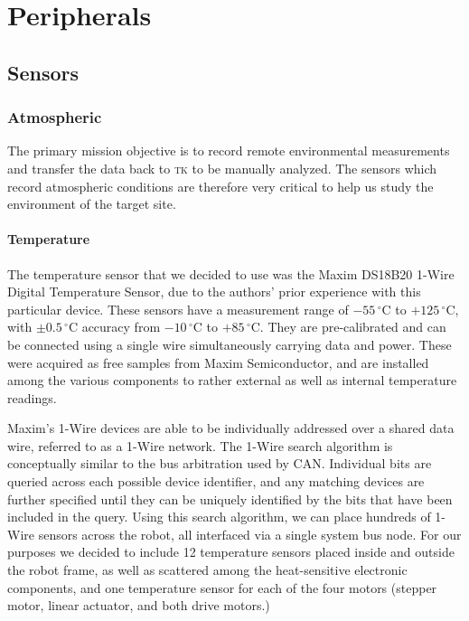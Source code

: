\documentclass[12pt]{article}
\newcommand{\brand}{}
\newcommand{\degrees}{\,^{\circ}\mathrm{C}}
\begin{document}
\section{Peripherals}
\subsection{Sensors}
\subsubsection{Atmospheric}
The primary mission objective is to record remote environmental measurements and transfer the data back to \textsc{tk} to be manually analyzed. The sensors which record atmospheric conditions are therefore very critical to help us study the environment of the target site.
    \paragraph*{Temperature}
    The temperature sensor that we decided to use was the \brand{Maxim DS18B20} 1-Wire Digital Temperature Sensor, due to the authors' prior experience with this particular device. These sensors have a measurement range of $-55\degrees{}$ to $+125\degrees{}$, with $\pm0.5\degrees{}$ accuracy from $-10\degrees{}$ to $+85\degrees{}$. They are pre-calibrated and can be connected using a single wire simultaneously carrying data and power. These were acquired as free samples from Maxim Semiconductor, and are installed among the various components to rather external as well as internal temperature readings.

    Maxim's 1-Wire devices are able to be individually addressed over a shared data wire, referred to as a 1-Wire network. The 1-Wire search algorithm is conceptually similar to the bus arbitration used by CAN. Individual bits are queried across each possible device identifier, and any matching devices are further specified until they can be uniquely identified by the bits that have been included in the query\cite{1wiresearch}. Using this search algorithm, we can place hundreds of 1-Wire sensors across the robot, all interfaced via a single system bus node. For our purposes we decided to include 12 temperature sensors placed inside and outside the robot frame, as well as scattered among the heat-sensitive electronic components, and one temperature sensor for each of the four motors (stepper motor, linear actuator, and both drive motors.)
\end{document}
